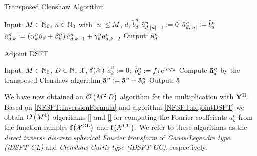 \begin{algorithm}[htb]
  \caption{Transposed Clenshaw Algorithm}
  \label{NFSFT:transposedClenshaw}    
  \begin{algorithmic}
    \STATE  Input: $M \in \mathbb{N}_{0}$, $n \in \mathbb{N}_{0}$ with $\left\vert n\right\vert \le M$, $d$, $\tilde{b}^n_{d}$
    \STATE
    \STATE $\tilde{a}_{d,\left\vert n\right\vert-1}^n := 0$
    \STATE $\tilde{a}_{d,\left\vert n\right\vert}^n := \tilde{b}^n_{d}$
      \STATE $\tilde{a}_{d,k}^n := \left(\alpha_{k}^n\vartheta_{d} + \beta_{k}^n\right)\tilde{a}_{d,k-1}^n + \gamma_{k}^n \tilde{a}_{d,k-2}^n$
    \ENDFOR
    \STATE
    \STATE Output: $\mathbf{\tilde{a}}^n_{d}$
\end{algorithmic}
\end{algorithm}
\begin{algorithm}[htb]
  \caption{Adjoint DSFT}
  \label{NFSFT:adjointDSFT}    
  \begin{algorithmic}
    \STATE  Input: $M \in \mathbb{N}_{0}$, $D \in \mathbb{N}$, $\mathcal{X}$, $\mathbf{f}{\hspace{-0.4ex}}\left(\mathcal{X}\right)$
    \STATE
        \STATE $\tilde{a}_{k}^n := 0;$
      \ENDFOR
    \ENDFOR
        \STATE $\tilde{b}^n_{d} := f_{d} \: \mbox{\rm{e}}^{\mbox{\scriptsize\rm{i}} n \varphi_{d}}$
        \STATE Compute $\mathbf{\tilde{a}}^n_{d}$ by the transposed Clenshaw algorithm
        \STATE $\mathbf{\tilde{a}}^n := \mathbf{\tilde{a}}^n + \mathbf{\tilde{a}}^n_{d}$
      \ENDFOR
    \ENDFOR
    \STATE
    \STATE Output: $\mathbf{\tilde{a}}$
\end{algorithmic}
\end{algorithm}

We have now obtained an $\mathcal{O}\left(M^2\:D\right)$ algorithm for the multiplication with $\mathbf{Y}^{\text{\rm{H}}}$. Based on \ref{NFSFT:InversionFormula} and algorithm \ref{NFSFT:adjointDSFT} we obtain $\mathcal{O}\left(M^4\right)$ algorithms \ref{} and \ref{} for computing the Fourier coeffcients $a_{k}^n$ from the function samples $\mathbf{f}{\hspace{-0.4ex}}\left(\mathcal{X}^{\mbox{\scriptsize\rm{GL}}}\right)$ and $\mathbf{f}{\hspace{-0.4ex}}\left(\mathcal{X}^{\mbox{\scriptsize\rm{CC}}}\right)$. We refer to these algorithms as the \emph{direct inverse discrete spherical Fourier transform} of \emph{Gauss-Legendre type (iDSFT-GL)} and \emph{Clenshaw-Curtis type (iDSFT-CC)}, respectively.

